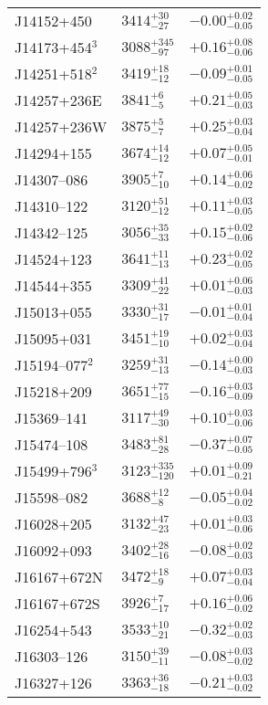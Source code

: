 \documentclass{aa}
\begin{document}
\begin{appendix}
\begin{center}
\begin{xtabular}{lll}
J14152+450 & $3414_{-27}^{+30}$ & $-0.00_{-0.05}^{+0.02}$ \\
J14173+454$^{3}$ & $3088_{-97}^{+345}$ & $+0.16_{-0.06}^{+0.08}$ \\
J14251+518$^{2}$ & $3419_{-12}^{+18}$ & $-0.09_{-0.05}^{+0.01}$ \\
J14257+236E & $3841_{-5}^{+6}$ & $+0.21_{-0.03}^{+0.05}$ \\
J14257+236W & $3875_{-7}^{+5}$ & $+0.25_{-0.04}^{+0.03}$ \\
J14294+155 & $3674_{-12}^{+14}$ & $+0.07_{-0.01}^{+0.05}$ \\
J14307--086 & $3905_{-10}^{+7}$ & $+0.14_{-0.02}^{+0.06}$ \\
J14310--122 & $3120_{-12}^{+51}$ & $+0.11_{-0.05}^{+0.03}$ \\
J14342--125 & $3056_{-33}^{+35}$ & $+0.15_{-0.06}^{+0.02}$ \\
J14524+123 & $3641_{-13}^{+11}$ & $+0.23_{-0.05}^{+0.02}$ \\
J14544+355 & $3309_{-22}^{+41}$ & $+0.01_{-0.03}^{+0.06}$ \\
J15013+055 & $3330_{-17}^{+31}$ & $-0.01_{-0.04}^{+0.01}$ \\
J15095+031 & $3451_{-10}^{+19}$ & $+0.02_{-0.04}^{+0.03}$ \\
J15194--077$^{2}$ & $3259_{-13}^{+31}$ & $-0.14_{-0.03}^{+0.00}$ \\
J15218+209 & $3651_{-15}^{+77}$ & $-0.16_{-0.09}^{+0.03}$ \\
J15369--141 & $3117_{-30}^{+49}$ & $+0.10_{-0.06}^{+0.03}$ \\
J15474--108 & $3483_{-28}^{+81}$ & $-0.37_{-0.05}^{+0.07}$ \\
J15499+796$^{3}$ & $3123_{-120}^{+335}$ & $+0.01_{-0.21}^{+0.09}$ \\
J15598--082 & $3688_{-8}^{+12}$ & $-0.05_{-0.02}^{+0.04}$ \\
J16028+205 & $3132_{-23}^{+47}$ & $+0.01_{-0.06}^{+0.03}$ \\
J16092+093 & $3402_{-16}^{+28}$ & $-0.08_{-0.03}^{+0.02}$ \\
J16167+672N & $3472_{-9}^{+18}$ & $+0.07_{-0.04}^{+0.03}$ \\
J16167+672S & $3926_{-17}^{+7}$ & $+0.16_{-0.02}^{+0.06}$ \\
J16254+543 & $3533_{-21}^{+10}$ & $-0.32_{-0.03}^{+0.02}$ \\
J16303--126 & $3150_{-11}^{+39}$ & $-0.08_{-0.02}^{+0.03}$ \\
J16327+126 & $3363_{-18}^{+36}$ & $-0.21_{-0.02}^{+0.03}$ \\

\end{xtabular}
\end{center}
\end{appendix}
\end{document}

